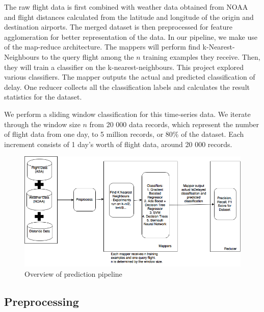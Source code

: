 \documentclass[letterpaper,11pt]{article}
\begin{document}
The raw flight data is first combined with weather data obtained from NOAA and flight distances calculated from the latitude and longitude of the origin and destination airports. The merged dataset is then preprocessed for feature agglomeration for better representation of the data. In our pipeline, we make use of the map-reduce architecture. The mappers will perform find k-Nearest-Neighbours to the query flight among the $n$ training examples they receive. Then, they will train a classifier on the k-nearest-neighbours. This project explored various classifiers. The mapper outputs the actual and predicted classification of delay. One reducer collects all the classification labels and calculates the result statistics for the dataset. 

We perform a sliding window classification for this time-series data. We iterate through the window size $n$ from 20 000 data records, which represent the number of flight data from one day, to 5 million records, or 80\% of the dataset. Each increment consists of 1 day's worth of flight data, around 20 000 records. 

\begin{figure}[htb]
\centering
\includegraphics[width=0.7\linewidth]{CS5228-final.png}
\caption{Overview of prediction pipeline}
\label{fig:overview}
\end{figure}

\subsection{Preprocessing}
\end{document}
